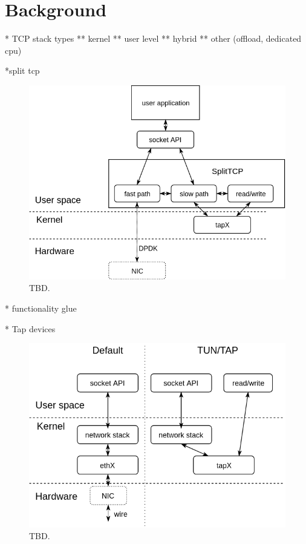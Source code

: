 \section{Background}\label{Background}


* TCP stack types
** kernel
** user level
** hybrid
** other (offload, dedicated cpu)

*split tcp

\begin{figure}
\centering
\includegraphics[width=\columnwidth]{figures/splittcp.png}
\caption{TBD.}
\label{fig:splittcp}
\end{figure}


* functionality glue

* Tap devices


\begin{figure}
\centering
\includegraphics[width=\columnwidth]{figures/tap_diag.png}
\caption{TBD.}
\label{fig:tap}
\end{figure}